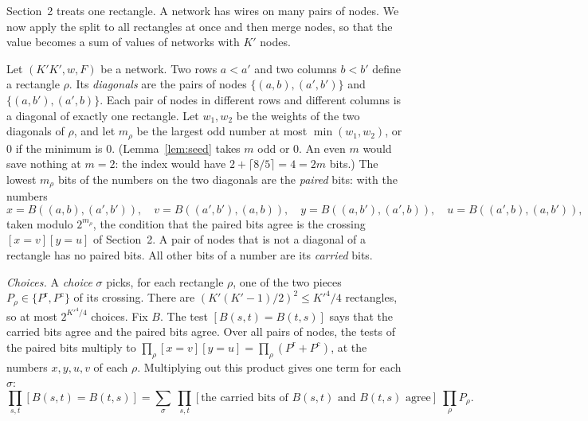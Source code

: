 \documentclass[11pt]{article}
\begin{document}
Section~2 treats one rectangle. A network has wires on many pairs of nodes. We now apply the split to all rectangles at once and then merge nodes, so that the value becomes a sum of values of networks with $K'$ nodes.

Let $(K'K',w,F)$ be a network. Two rows $a<a'$ and two columns $b<b'$ define a rectangle $\rho$. Its \emph{diagonals} are the pairs of nodes $\{(a,b),(a',b')\}$ and $\{(a,b'),(a',b)\}$. Each pair of nodes in different rows and different columns is a diagonal of exactly one rectangle. Let $w_1,w_2$ be the weights of the two diagonals of $\rho$, and let $m_\rho$ be the largest odd number at most $\min(w_1,w_2)$, or $0$ if the minimum is $0$. (Lemma~\ref{lem:seed} takes $m$ odd or $0$. An even $m$ would save nothing at $m=2$: the index would have $2+\lceil8/5\rceil=4=2m$ bits.) The lowest $m_\rho$ bits of the numbers on the two diagonals are the \emph{paired} bits: with the numbers
\[
x=B((a,b),(a',b')),\quad v=B((a',b'),(a,b)),\quad y=B((a,b'),(a',b)),\quad u=B((a',b),(a,b')),
\]
taken modulo $2^{m_\rho}$, the condition that the paired bits agree is the crossing $[x=v][y=u]$ of Section~2. A pair of nodes that is not a diagonal of a rectangle has no paired bits. All other bits of a number are its \emph{carried} bits.

\emph{Choices.} A \emph{choice} $\sigma$ picks, for each rectangle $\rho$, one of the two pieces $P_\rho\in\{P^{\mathrm r},P^{\mathrm c}\}$ of its crossing. There are $(K'(K'-1)/2)^2\le K'^4/4$ rectangles, so at most $2^{K'^4/4}$ choices. Fix $B$. The test $[B(s,t)=B(t,s)]$ says that the carried bits agree and the paired bits agree. Over all pairs of nodes, the tests of the paired bits multiply to $\prod_\rho[x=v][y=u]=\prod_\rho(P^{\mathrm r}+P^{\mathrm c})$, at the numbers $x,y,u,v$ of each $\rho$. Multiplying out this product gives one term for each $\sigma$:
\begin{equation}\label{expand}
\prod_{s,t}[B(s,t)=B(t,s)]=\sum_\sigma\ \prod_{s,t}[\text{the carried bits of $B(s,t)$ and $B(t,s)$ agree}]\ \prod_\rho P_\rho.
\end{equation}
\end{document}
